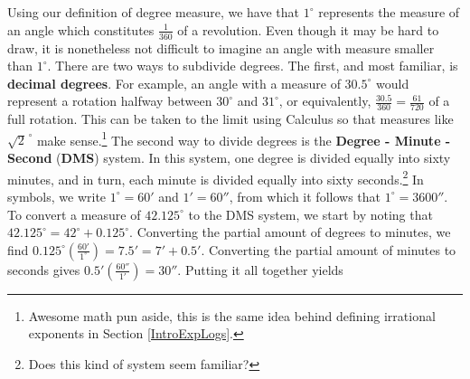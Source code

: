 \documentclass[12pt]{ximera}
\begin{document}
\[ \begin{array}{ccc}

 

&

\hspace{.5in}

 

&

\hspace{.5in}

 

\\  \end{array} \]

Using our definition of degree measure, we have that $1^{\circ}$ represents the measure of an angle which constitutes $\frac{1}{360}$ of a revolution.  Even though it may be hard to draw, it is nonetheless not difficult to imagine an angle with measure smaller than $1^{\circ}$.  There are two ways to subdivide degrees.  The first, and most familiar, is \textbf{decimal degrees}.  For example, an angle with a measure of $30.5^{\circ}$ would represent a rotation halfway between $30^{\circ}$ and $31^{\circ}$, or equivalently, $\frac{30.5}{360} = \frac{61}{720}$ of a full rotation.  This can be taken to the limit using Calculus so that measures like $\sqrt{2}^{\, \circ}$ make sense.\footnote{Awesome math pun aside, this is the same idea behind defining irrational exponents in Section \ref{IntroExpLogs}.}  The second way to divide degrees is the \textbf{Degree - Minute - Second} (\textbf{DMS}) system.  In this system, one degree is divided equally into sixty minutes, and in turn, each minute is divided equally into sixty seconds.\footnote{Does this kind of system seem familiar?}  In symbols, we write $1^{\circ} = 60'$ and $1' = 60''$, from which it follows that  $1^{\circ} = 3600''$.  To convert a measure of $42.125^{\circ}$ to the DMS system, we start by noting that $42.125^{\circ} = 42^{\circ} + 0.125^{\circ}$. Converting the partial amount of degrees to minutes, we find $0.125^{\circ} \left( \frac{60'}{1^{\circ}} \right) = 7.5' = 7' + 0.5'$. Converting the partial amount of minutes to seconds gives  $0.5' \left(\frac{60''}{1'} \right) = 30''$.  Putting it all together yields 
\end{document}
